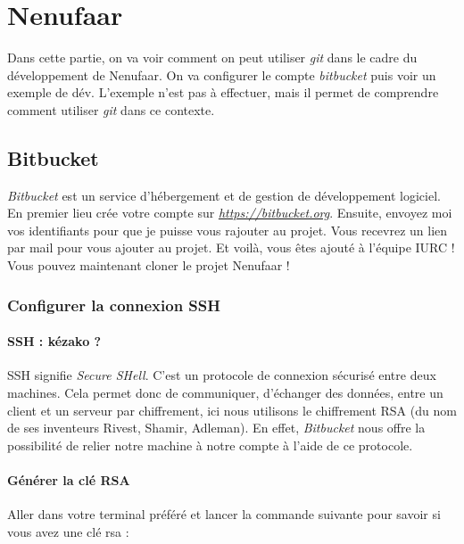 \documentclass[12pt,a4paper]{article}
\begin{document}
\section{Nenufaar}
{
Dans cette partie, on va voir comment on peut utiliser \emph{git} dans le cadre du développement de Nenufaar. On va configurer le compte \emph{bitbucket} puis voir un exemple de dév. L'exemple n'est pas à effectuer, mais il permet de comprendre comment utiliser \emph{git} dans ce contexte.

\subsection{Bitbucket}

\emph{Bitbucket} est un service d'hébergement et de gestion de développement logiciel. En premier lieu crée votre compte sur \emph{\href{https://bitbucket.org}{https://bitbucket.org}}. Ensuite, envoyez moi vos identifiants pour que je puisse vous rajouter au projet. Vous recevrez un lien par mail pour vous ajouter au projet. Et voilà, vous êtes ajouté à l'équipe IURC ! Vous pouvez maintenant cloner le projet Nenufaar !

\subsubsection{Configurer la connexion SSH}

\paragraph*{SSH : kézako ?} SSH signifie \emph{Secure SHell}. C'est un protocole de connexion sécurisé entre deux machines. Cela permet donc de communiquer, d'échanger des données, entre un client et un serveur par chiffrement, ici nous utilisons le chiffrement RSA (du nom de ses inventeurs Rivest, Shamir, Adleman). En effet, \emph{Bitbucket} nous offre la possibilité de relier notre machine à notre compte à l'aide de ce protocole. 

\paragraph{Générer la clé RSA} Aller dans votre terminal préféré et lancer la commande suivante pour savoir si vous avez une clé rsa :
}

{
}
\end{document}

